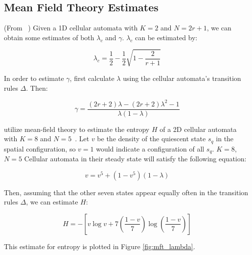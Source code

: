 \documentclass[a4paper,11pt]{report}
\begin{document}
\begin{appendices}
\section{Mean Field Theory Estimates}
\label{appA:MFT}
(From \citeauthor{li90b}~\cite{li90b}) Given a 1D cellular automata with $K=2$ and $N = 2r+1$, we can obtain some estimates of both $\lambda_c$ and $\gamma$. $\lambda_c$ can be estimated by:

\begin{equation}
\lambda_c = \frac{1}{2} - \frac{1}{2}\sqrt{1 - \frac{2}{r+1}}
\end{equation}

In order to estimate $\gamma$, first calculate $\lambda$ using the cellular automata's transition rules $\Delta$. Then:

\begin{equation}
\gamma = \frac{(2r+2)\lambda - (2r + 2)\lambda^2 - 1}{\lambda(1-\lambda)}
\end{equation}

\pagebreak

\citeauthor{wo90} utilize mean-field theory to estimate the entropy $H$ of a 2D cellular automata with $K=8$ and $N=5$~\cite{wo90}. Let $v$ be the density of the quiescent state $s_q$ in the spatial configuration, so $v=1$ would indicate a configuration of all $s_q$. $K=8$, $N=5$ Cellular automata in their steady state will satisfy the following equation:

\begin{equation}
v = v^5 + (1 - v^5)(1- \lambda)
\end{equation}

Then, assuming that the other seven states appear equally often in the transition rules $\Delta$, we can estimate $H$:

\begin{equation}
H = -\left[ v \log v + 7\left(\frac{1-v}{7}\right)\log\left(\frac{1-v}{7}\right)\right]
\end{equation}

This estimate for entropy is plotted in Figure \ref{fig:mft_lambda}.


\end{appendices}
\end{document}
